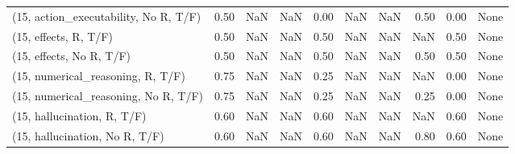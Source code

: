 \begin{table*}[h!]
\begin{adjustbox}{width=2\columnwidth,center}
\begin{tabular}{lrrr|rrr|rrr}
(15, action\_executability, No R, T/F) &                      0.50 &                   NaN &                       NaN &                          0.00 &                       NaN &                           NaN &                                   0.50 &                               0.00 &                                  None \\
(15, effects, R, T/F)                 &                      0.50 &                   NaN &                       NaN &                          0.50 &                       NaN &                           NaN &                                    NaN &                               0.50 &                                  None \\
(15, effects, No R, T/F)              &                      0.50 &                   NaN &                       NaN &                          0.50 &                       NaN &                           NaN &                                   0.50 &                               0.50 &                                  None \\
(15, numerical\_reasoning, R, T/F)     &                      0.75 &                   NaN &                       NaN &                          0.25 &                       NaN &                           NaN &                                    NaN &                               0.00 &                                  None \\
(15, numerical\_reasoning, No R, T/F)  &                      0.75 &                   NaN &                       NaN &                          0.25 &                       NaN &                           NaN &                                   0.25 &                               0.00 &                                  None \\
(15, hallucination, R, T/F)           &                      0.60 &                   NaN &                       NaN &                          0.60 &                       NaN &                           NaN &                                    NaN &                               0.60 &                                  None \\
(15, hallucination, No R, T/F)        &                      0.60 &                   NaN &                       NaN &                          0.60 &                       NaN &                           NaN &                                   0.80 &                               0.60 &                                  None \\

\end{tabular}
\end{adjustbox}
\end{table*}
